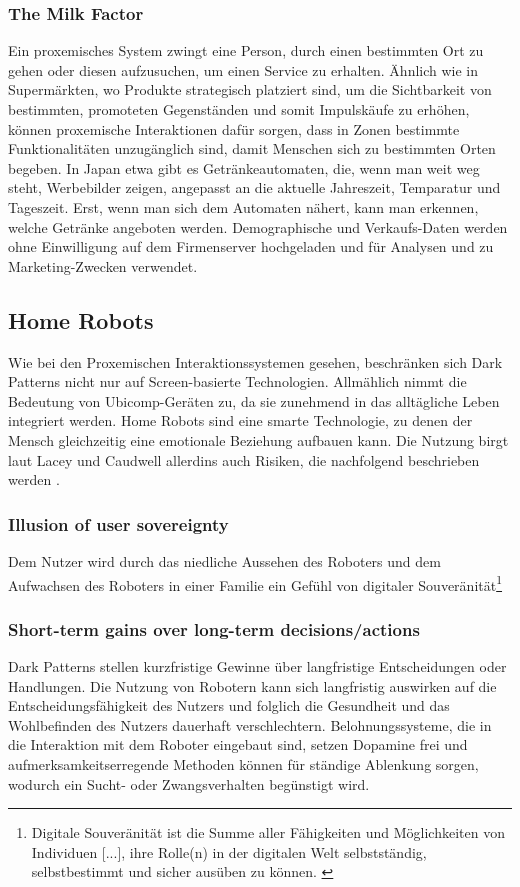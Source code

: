 \documentclass[a4paper]{article}
\begin{document}
\subsubsection{The Milk Factor}
\label{sssec:the_milk_factor}
Ein proxemisches System zwingt eine Person, durch einen bestimmten Ort zu gehen oder diesen aufzusuchen, um einen Service zu erhalten.\newline
Ähnlich wie in Supermärkten, wo Produkte strategisch platziert sind, um die Sichtbarkeit von bestimmten, promoteten Gegenständen und somit Impulskäufe zu erhöhen, können proxemische Interaktionen dafür sorgen, dass in Zonen bestimmte Funktionalitäten unzugänglich sind, damit Menschen sich zu bestimmten Orten begeben.\newline
In Japan etwa gibt es Getränkeautomaten, die, wenn man weit weg steht, Werbebilder zeigen, angepasst an die aktuelle Jahreszeit, Temparatur und Tageszeit. Erst, wenn man sich dem Automaten nähert, kann man erkennen, welche Getränke angeboten werden. Demographische und Verkaufs-Daten werden ohne Einwilligung auf dem Firmenserver hochgeladen und für Analysen und zu Marketing-Zwecken verwendet.

\subsection{Home Robots}
\label{sub:home_robots}
Wie bei den Proxemischen Interaktionssystemen gesehen, beschränken sich Dark Patterns nicht nur auf Screen-basierte Technologien. Allmählich nimmt die Bedeutung von Ubicomp-Geräten zu, da sie zunehmend in das alltägliche Leben integriert werden. Home Robots sind eine smarte Technologie, zu denen der Mensch gleichzeitig eine emotionale Beziehung aufbauen kann. Die Nutzung birgt laut Lacey und Caudwell allerdins auch Risiken, die nachfolgend beschrieben werden \cite{lacey}.

\subsubsection{Illusion of user sovereignty}
Dem Nutzer wird durch das niedliche Aussehen des Roboters und dem \glqq Aufwachsen\grqq{} des Roboters in einer Familie ein Gefühl von digitaler Souveränität\footnote{\label{foot:12} Digitale Souveränität ist die Summe aller Fähigkeiten und Möglichkeiten von Individuen [...], ihre Rolle(n) in der digitalen Welt selbstständig, selbstbestimmt und sicher ausüben zu können. \cite{oeffentliche_it}}

\subsubsection{Short-term gains over long-term decisions/actions}
Dark Patterns stellen kurzfristige Gewinne über langfristige Entscheidungen oder Handlungen. Die Nutzung von Robotern kann sich langfristig auswirken auf die Entscheidungsfähigkeit des Nutzers und folglich die Gesundheit und das Wohlbefinden des Nutzers dauerhaft verschlechtern. Belohnungssysteme, die in die Interaktion mit dem Roboter eingebaut sind, setzen Dopamine frei und aufmerksamkeitserregende Methoden können für ständige Ablenkung sorgen, wodurch ein Sucht- oder Zwangsverhalten begünstigt wird. 
\end{document}
